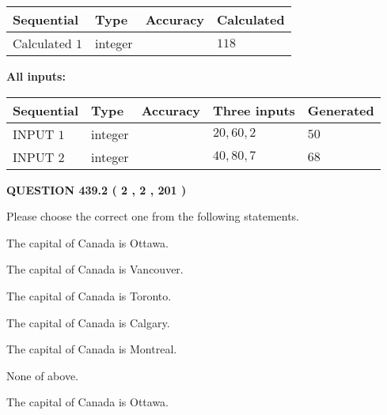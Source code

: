 \documentclass[12pt]{article}
\begin{document}
   
  
  
\noindent\begin{tabular}{|l|l|l|l|}
\hline
 Sequential & Type & Accuracy & Calculated \\ 
\hline
 
 
  Calculated $  1 $ & integer &  & 
  $ 118 $ 
 \\  \hline  
 \end{tabular}
   
   
   
   
\noindent\vspace{0.1in}\hspace{-0.08in} {\textbf{\Large{All inputs: }}}
   
   
  
  
\noindent\begin{tabular}{|l|l|l|l|l|}
\hline
 Sequential & Type & Accuracy & Three inputs & Generated \\ 
\hline
 
 
  INPUT $  1 $ & integer &  & $
 20
 , 
 60
 , 
 2
 $ & $ 50 $ 
 \\  \hline  
 
 
  INPUT $  2 $ & integer &  & $
 40
 , 
 80
 , 
 7
 $ & $ 68 $ 
 \\  \hline  
 \end{tabular}
   
   
  
\vspace{0.2in}
  
{\textbf{\Large{QUESTION
439.2 
 ( 2 , 2 , 201 )
}}}
  
  
Please choose the correct one from the following statements.
 
 
The capital of Canada is Ottawa.
 
 
The capital of Canada is Vancouver.
 
 
The capital of Canada is Toronto.
 
 
The capital of Canada is Calgary.
 
 
The capital of Canada is Montreal.
 
 
 None of above.
 
 
\noindent{}
 
 
The capital of Canada is Ottawa.
 
\end{document}

